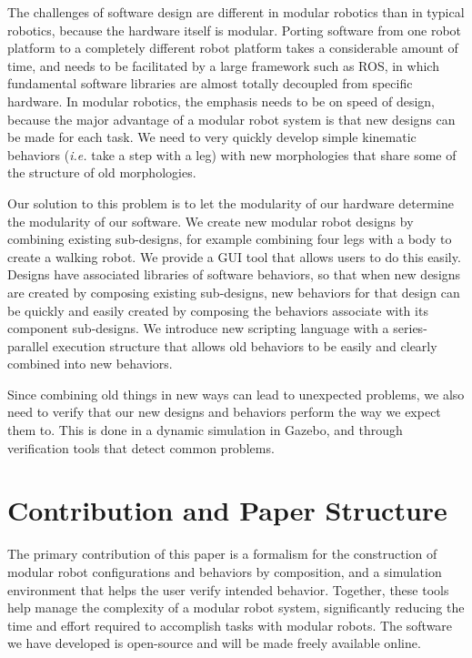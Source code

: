 \documentclass[conference]{IEEEtran}
\theoremstyle{definition}
\begin{document}
The challenges of software design are different in modular robotics than
in typical robotics, because the hardware itself is modular. Porting software
from one robot platform to a completely different robot platform takes a
considerable amount of time, and needs to be facilitated by a large framework
such as ROS, in which fundamental software libraries are almost totally decoupled from
specific hardware. In modular robotics, the emphasis needs to be on speed of
design, because the major advantage of a modular robot system is that new
designs can be made for each task. We need to  very quickly develop simple kinematic
behaviors (\textit{i.e.} take a step with a leg) with new morphologies that share some of the
structure of old morphologies.

Our solution to this problem is to let the modularity of our hardware determine the
modularity of our software. We create new modular robot designs by combining existing sub-designs,
for example combining four legs with a body to create a walking robot.
We provide a GUI tool that allows users to do this easily. Designs have
associated libraries of software behaviors, so that when new designs are created
by composing existing sub-designs, new behaviors for that design can be quickly
and easily created by composing the behaviors associate with its component
sub-designs. We introduce new scripting language with a series-parallel
execution structure that allows old behaviors to be easily and clearly combined
into new behaviors.

Since combining old things in new ways can lead to unexpected problems, we also
need to verify that our new designs and behaviors perform the way we expect them
to. This is done in a dynamic simulation in Gazebo, and through
verification tools that detect common problems.


\section{Contribution and Paper Structure}

The primary contribution of this paper is a formalism for the construction of modular
robot configurations and behaviors by composition, and a simulation
environment that helps the user verify intended behavior.  Together, these tools
help manage the complexity of a modular robot system, significantly reducing the
time and effort required to accomplish tasks with modular robots.  The software we
have developed is open-source and will be made freely available online.
\end{document}
